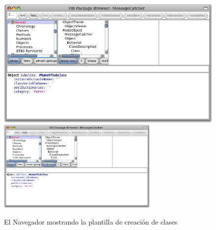 \documentclass[spanish,a4paper,10pt,twoside]{book}
\begin{document}
\begin{figure}[htbp]
   \centering
   \ifluluelse
	   {\includegraphics[width=\textwidth]{SystemBrowserClassCreation}}
	   {\includegraphics[width=0.7\textwidth]{SystemBrowserClassCreation}}
   \caption{El Navegador mostrando la plantilla de creaci\'on de clases
   }
\end{figure}
\end{document}
